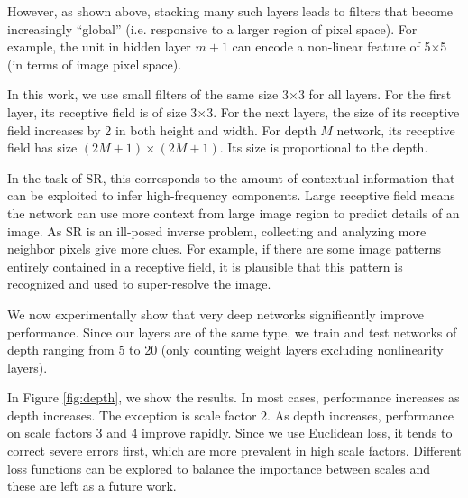 \documentclass[10pt,twocolumn,letterpaper]{article}
\begin{document}
However, as shown above, stacking many such layers leads to filters that become increasingly “global” (i.e. responsive to a larger region of pixel space). For example, the unit in hidden layer $m+1$ can encode a non-linear feature of 5$\times$5 (in terms of image pixel space).

In this work, we use small filters of the same size 3$\times$3 for all layers. For the first layer, its receptive field is of size 3$\times$3. For the next layers, the size of its receptive field increases by 2 in both height and width. For depth $M$ network, its receptive field has size $(2M+1)\times(2M+1)$. Its size is proportional to the depth.

In the task of SR, this corresponds to the amount of contextual information that can be exploited to infer high-frequency components. Large receptive field means the network can use more context from large image region to predict details of an image. As SR is an ill-posed inverse problem, collecting and analyzing more neighbor pixels give more clues. For example, if there are some image patterns entirely contained in a receptive field, it is plausible that this pattern is recognized and used to super-resolve the image. 

We now experimentally show that very deep networks significantly improve performance.  Since our layers are of the same type, we train and test networks of depth ranging from 5 to 20 (only counting weight layers excluding nonlinearity layers). 

In Figure \ref{fig:depth}, we show the results. In most cases, performance increases as depth increases. The exception is scale factor 2. As depth increases, performance on scale factors 3 and 4 improve rapidly. Since we use Euclidean loss, it tends to correct severe errors first, which are more prevalent in high scale factors. Different loss functions can be explored to balance the importance between scales and these are left as a future work. 
\end{document}
